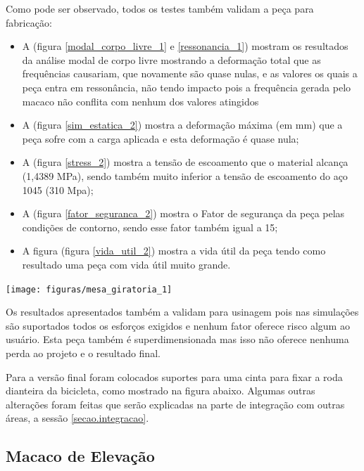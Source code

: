     Como pode ser observado, todos os testes também validam a peça para fabricação:
    \begin{itemize}
        \item A (figura \ref{modal_corpo_livre_1} e  \ref{ressonancia_1}) mostram os resultados da análise modal de corpo livre mostrando a deformação total que as frequências causariam, que novamente são quase nulas, e as valores os quais a peça entra em ressonância, não tendo impacto pois a frequência gerada pelo macaco não conflita com nenhum dos valores atingidos
        \item A (figura \ref{sim_estatica_2}) mostra a deformação máxima (em mm) que a peça sofre com a carga aplicada e esta deformação é quase nula;
        \item A (figura \ref{stress_2}) mostra a tensão de escoamento que o material alcança (1,4389 MPa), sendo também muito inferior a tensão de escoamento do aço 1045 (310 Mpa);
        \item A (figura \ref{fator_seguranca_2}) mostra o Fator de segurança da peça pelas condições de contorno, sendo esse fator também igual a 15;
        \item A figura (figura \ref{vida_util_2}) mostra a vida útil da peça tendo como resultado uma peça com vida útil muito grande.
    \end{itemize}

    \begin{center}
    	\texttt{[image: figuras/mesa\_giratoria\_1]}
        \label{mesa_giratoria_1}
    \end{center}

    Os resultados apresentados também a validam para usinagem pois nas simulações são suportados todos os esforços exigidos e nenhum fator oferece risco algum ao usuário. Esta peça também é superdimensionada mas isso não oferece nenhuma perda ao projeto e o resultado final.
    
    Para a versão final foram colocados suportes para uma cinta para fixar a roda dianteira da bicicleta, como mostrado na figura abaixo. Algumas outras alterações foram feitas que serão explicadas na parte de integração com outras áreas, a sessão \ref{secao.integracao}.
    

\subsection{Macaco de Elevação}

